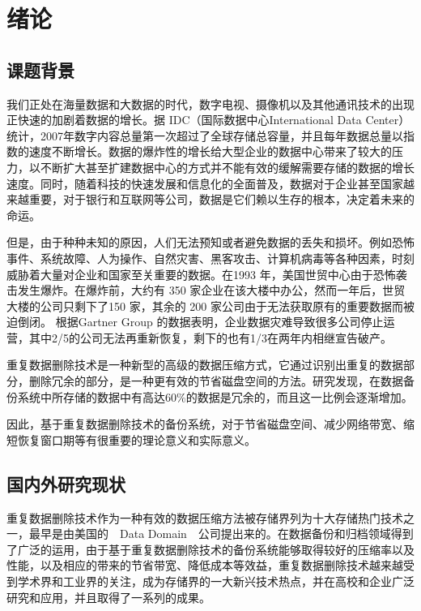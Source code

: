 \chapter{绪论}\thispagestyle{main}

\section{课题背景}

\par 我们正处在海量数据和大数据的时代，数字电视、摄像机以及其他通讯技术的出现正快速的加剧着数据的增长。据 IDC（国际数据中心International Data Center）统计，2007年数字内容总量第一次超过了全球存储总容量，并且每年数据总量以指数的速度不断增长。数据的爆炸性的增长给大型企业的数据中心带来了较大的压力，以不断扩大甚至扩建数据中心的方式并不能有效的缓解需要存储的数据的增长速度。同时，随着科技的快速发展和信息化的全面普及，数据对于企业甚至国家越来越重要，对于银行和互联网等公司，数据是它们赖以生存的根本，决定着未来的命运。

\par 但是，由于种种未知的原因，人们无法预知或者避免数据的丢失和损坏。例如恐怖事件、系统故障、人为操作、自然灾害、黑客攻击、计算机病毒等各种因素，时刻威胁着大量对企业和国家至关重要的数据。在1993 年，美国世贸中心由于恐怖袭击发生爆炸。在爆炸前，大约有 350 家企业在该大楼中办公，然而一年后，世贸大楼的公司只剩下了150 家，其余的 200 家公司由于无法获取原有的重要数据而被迫倒闭。 根据Gartner Group 的数据表明，企业数据灾难导致很多公司停止运营，其中2/5的公司无法再重新恢复，剩下的也有1/3在两年内相继宣告破产。

\par 重复数据删除技术是一种新型的高级的数据压缩方式，它通过识别出重复的数据部分，删除冗余的部分，是一种更有效的节省磁盘空间的方法。研究发现，在数据备份系统中所存储的数据中有高达60\%的数据是冗余的，而且这一比例会逐渐增加。

\par 因此，基于重复数据删除技术的备份系统，对于节省磁盘空间、减少网络带宽、缩短恢复窗口期等有很重要的理论意义和实际意义。

\section{国内外研究现状}

\par 重复数据删除技术作为一种有效的数据压缩方法被存储界列为十大存储热门技术之一，最早是由美国的\ \ Data Domain\ \ 公司提出来的。在数据备份和归档领域得到了广泛的运用，由于基于重复数据删除技术的备份系统能够取得较好的压缩率以及性能，以及相应的带来的节省带宽、降低成本等效益，重复数据删除技术越来越受到学术界和工业界的关注，成为存储界的一大新兴技术热点，并在高校和企业广泛研究和应用，并且取得了一系列的成果。
